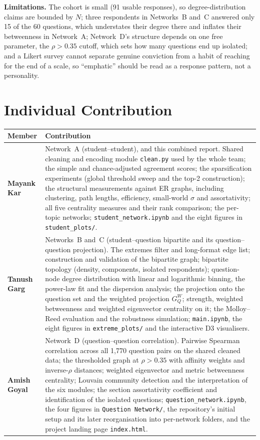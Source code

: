 \documentclass[11pt, a4paper]{article}
\begin{document}
\textbf{Limitations.} The cohort is small (91 usable responses), so degree-distribution claims are bounded by
$N$; three respondents in Networks~B and~C answered only 15 of the 60 questions, which understates their degree
there and inflates their betweenness in Network~A; Network~D's structure depends on one free parameter, the
$\rho > 0.35$ cutoff, which sets how many questions end up isolated; and a Likert survey cannot separate genuine
conviction from a habit of reaching for the end of a scale, so ``emphatic'' should be read as a response
pattern, not a personality.

\section{Individual Contribution}

\begin{center}
\begin{tabular}{p{3.2cm} p{11.5cm}}
\toprule
\textbf{Member} & \textbf{Contribution} \\
\midrule
\textbf{Mayank Kar} &
Network~A (student--student), and this combined report. Shared cleaning and encoding module \texttt{clean.py} used by the whole team;
the simple and chance-adjusted agreement scores; the sparsification experiments (global threshold sweep and the
top-2 construction); the structural measurements against ER graphs, including clustering, path lengths,
efficiency, small-world $\sigma$ and assortativity; all five centrality measures and their rank comparison; the
per-topic networks; \texttt{student\_network.ipynb} and the eight figures in \texttt{student\_plots/}. \\
\addlinespace
\textbf{Tanush Garg} &
Networks~B and~C (student--question bipartite and its question--question projection). The extremes filter and
long-format edge list; construction and validation of the bipartite graph; bipartite topology (density,
components, isolated respondents); question-node degree distribution with linear and logarithmic binning, the
power-law fit and the dispersion analysis; the projection onto the question set and the weighted projection
$G_Q^W$; strength, weighted betweenness and weighted eigenvector centrality on it; the Molloy--Reed evaluation
and the robustness simulation; \texttt{main.ipynb}, the eight figures in \texttt{extreme\_plots/} and the interactive
D3 visualisers. \\
\addlinespace
\textbf{Amish Goyal} &
Network~D (question--question correlation). Pairwise Spearman correlation across all 1{,}770 question pairs on
the shared cleaned data; the thresholded graph at $\rho > 0.35$ with affinity weights and inverse-$\rho$
distances; weighted eigenvector and metric betweenness centrality; Louvain community detection and the
interpretation of the six modules; the section assortativity coefficient and identification of the isolated
questions; \texttt{question\_network.ipynb}, the four figures in \texttt{Question Network/}, the repository's initial
setup and its later reorganisation into per-network folders, and the project landing page
\texttt{index.html}. \\
\bottomrule
\end{tabular}
\end{center}
\end{document}

